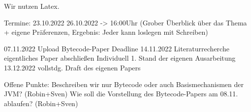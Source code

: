 Wir nutzen Latex.

Termine:
23.10.2022
26.10.2022 -> 16:00Uhr (Grober Überblick über das Thema + eigene Präferenzen, Ergebnis: Jeder kann loslegen mit Schreiben)

07.11.2022 Upload Bytecode-Paper Deadline
14.11.2022 Literaturrecherche eigentliches Paper abschließen
Individuell 1. Stand der eigenen Ausarbeitung
13.12.2022 vollstdg. Draft des eigenen Papers


Offene Punkte:
Beschreiben wir nur Bytecode oder auch Basismechanismen der JVM? (Robin+Sven)
Wie soll die Vorstellung des Bytecode-Papers am 08.11. ablaufen? (Robin+Sven)

